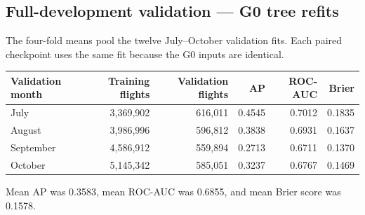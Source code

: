\subsection{Full-development validation --- G0 tree refits}
The four-fold means pool the twelve July--October validation fits. Each paired checkpoint uses the same fit because the G0 inputs are identical.
\begin{center}\small
\begin{tabular}{lrrrrr}
Validation month & Training flights & Validation flights & AP & ROC-AUC & Brier \\ \hline
July & 3,369,902 & 616,011 & 0.4545 & 0.7012 & 0.1835 \\
August & 3,986,996 & 596,812 & 0.3838 & 0.6931 & 0.1637 \\
September & 4,586,912 & 559,894 & 0.2713 & 0.6711 & 0.1370 \\
October & 5,145,342 & 585,051 & 0.3237 & 0.6767 & 0.1469 \\
\end{tabular}
\end{center}

Mean AP was 0.3583, mean ROC-AUC was 0.6855, and mean Brier score was 0.1578.
